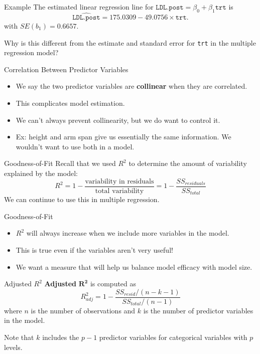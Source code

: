 \begin{frame}{Example}
    The estimated linear regression line for $\texttt{LDL.post} = \beta_0 + \beta_1 \texttt{trt}$ is 
    \[
        \hat{\texttt{LDL.post}}=175.0309 -49.0756\times\texttt{trt}.
    \]
    with $SE(b_1) = 0.6657$. 
    
    \vspace{12pt}Why is this different from the estimate and standard error for \texttt{trt} in the multiple regression model?
\end{frame}

\begin{frame}{Correlation Between Predictor Variables}
    \begin{itemize}
        \item We say the two predictor variables are \textbf{collinear} when they are correlated.
        \item This complicates model estimation.
        \item We can't always prevent collinearity, but we do want to control it.
        \item Ex: height and arm span give us essentially the same information. We wouldn't want to use both in a model.
    \end{itemize}
\end{frame}

\begin{frame}{Goodness-of-Fit}
    Recall that we used $R^2$ to determine the amount of variability explained by the model:
    \[
        R^2 = 1 - \frac{\text{variability in residuals}}{\text{total variability}} = 1- \frac{SS_{residuals}}{SS_{total}}
    \]
    We can continue to use this in multiple regression.
\end{frame}

\begin{frame}{Goodness-of-Fit}
    \begin{itemize}
        \item $R^2$ will always increase when we include more variables in the model.
        \item This is true even if the variables aren't very useful!
        \item We want a measure that will help us balance model efficacy with model size.
    \end{itemize}
\end{frame}

\begin{frame}{Adjusted $R^2$}
    \textbf{Adjusted} $\boldsymbol{R^2}$ is computed as
    \[
        R^2_{adj} = 1 - \frac{SS_{resid}/(n-k-1)}{SS_{total}/(n-1)}
    \]
    where $n$ is the number of observations and $k$ is the number of predictor variables in the model.
    
    \vspace{12pt} Note that $k$ includes the $p-1$ predictor variables for categorical variables with $p$ levels.
\end{frame}

